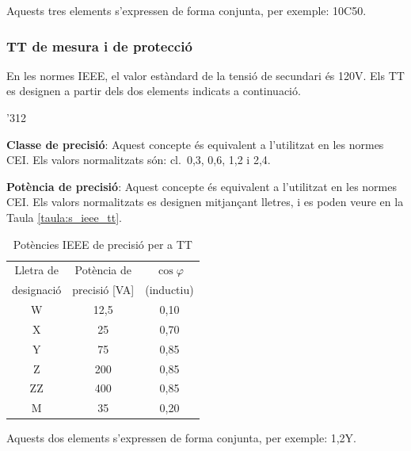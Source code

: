 Aquests tres elements s'expressen de forma conjunta, per exemple:
10C50.

\subsubsection{TT de mesura i de protecci\'{o}}

En les normes \textsf{IEEE}, el valor est\`{a}ndard de la tensi\'{o} de
secundari \'{e}s 120\unit{V}. Els TT es designen a partir dels dos
elements indicats a continuaci\'{o}.

\begin{dingautolist}{'312}
    \item \textbf{Classe de precisi\'{o}}: Aquest concepte \'{e}s equivalent
    a l'utilitzat en les normes \textsf{CEI}. Els valors
    normalitzats s\'{o}n: cl.~0,3, 0,6, 1,2 i 2,4.
    \item \textbf{Pot\`{e}ncia de precisi\'{o}}: Aquest concepte \'{e}s equivalent
    a l'utilitzat en les normes \textsf{CEI}. Els valors
    normalitzats es designen mitjan\c{c}ant lletres, i es poden veure en
    la Taula \vref{taula:s_ieee_tt}.

    \begin{table}[h]
    \caption{\label{taula:s_ieee_tt} Pot\`{e}ncies \textsf{IEEE} de precisi\'{o}  per a TT}
    \begin{center}\begin{tabular}{ccc}
    \toprule[1pt]
    Lletra de & Pot\`{e}ncia de & $\cos\varphi$\\
    designaci\'{o} &  precisi\'{o} [VA] &  (inductiu)\\
    \midrule
        W & 12,5 & 0,10\\
        X & 25 & 0,70 \\
        Y & 75 & 0,85 \\
        Z & 200 & 0,85 \\
        ZZ & 400 & 0,85 \\
        M & 35 & 0,20 \\
    \bottomrule[1pt]
    \end{tabular} \end{center}
    \end{table}
\end{dingautolist}

Aquests dos elements s'expressen de forma conjunta, per exemple:
1,2Y.


